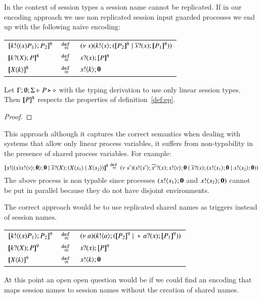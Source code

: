 In the context of session types a session name cannot be replicated.
If in our encoding approach we use non replicated session input guarded
processes we end up with the following naive encoding:

\begin{definition}

	\begin{tabular}{lcl}
		$[\!\![k ! \langle (x)P_1 \rangle ; P_2]\!\!]^{8}$ &$\stackrel{\mathtt{def}\ }{=}$& $ \newsp{s}{\bout{k}{s} (\map{P_2}^8 \Par \binp{\dual{s}}{x} \map{P_1}^8)} $\\
		$[\!\![k ? (X) ; P]\!\!]^{8}$ &$\stackrel{\mathtt{def}\ }{=}$& $s ? (x) ; [\!\![P]\!\!]^8$\\
		$[\!\![X\langle k \rangle]\!\!]^8$ &$\stackrel{\mathtt{def}\ }{=}$& $x ! \langle k \rangle ; \mathbf{0}$
	\end{tabular}
\end{definition}

\begin{proposition}
	Let $\Gamma;\emptyset;\Sigma \vdash P \triangleright \diamond$ with
	the typing derivation to use only linear session types. Then
	$[\!\![P]\!\!]^8$ respects the properties of definition~\ref{def:ep}.
\end{proposition}

\begin{proof}
\end{proof}

This approach although it captures the correct semantics when
dealing with systems that allow only linear process variables,
it suffers from non-typability in the presence
of shared process variables. For example:
\[
	[\!\![s ! \langle (x)x ! \langle v \rangle ;\mathbf{0} \rangle ; \mathbf{0} \;|\; \overline{s} ? (X) ; (X\langle s_1 \rangle \;|\; X\langle s_2 \rangle)]\!\!]^8 \stackrel{\mathtt{def}\ }{=}
	(\nu\ s')(s ! \langle s' \rangle ; \overline{s'} ? (x) ; x ! \langle v \rangle ; \mathbf{0} \;|\; \overline{s} ? (x) ; (x ! \langle s_1 \rangle ; \mathbf{0} \;|\; x ! \langle s_2 \rangle ; \mathbf{0}))
\]
The above process is non typable since processes $(x ! \langle s_1 \rangle ; \mathbf{0}$ and $x ! \langle s_2 \rangle ; \mathbf{0})$
cannot be put in parallel because they do not have disjoint environments.

The correct approach would be to use replicated shared names
as triggers instead of session names. 

\begin{definition}

	\begin{tabular}{lcl}
		$[\!\![k ! \langle (x)P_1 \rangle ; P_2]\!\!]^{9}$ &$\stackrel{\mathtt{def}\ }{=}$& $ \newsp{a}{\bout{k}{a} (\map{P_2}^9 \Par \repl{} \binp{a}{x}  \map{P_1}^9)} $\\
		$[\!\![k ? (X) ; P]\!\!]^{9}$ &$\stackrel{\mathtt{def}\ }{=}$& $s ? (x) ; [\!\![P]\!\!]^9$\\
		$[\!\![X\langle k \rangle]\!\!]^9$ &$\stackrel{\mathtt{def}\ }{=}$& $x ! \langle k \rangle ; \mathbf{0}$
	\end{tabular}
\end{definition}

At this point an open open question would be if
we could find an encoding that maps
session names to session names without the creation
of shared names.



